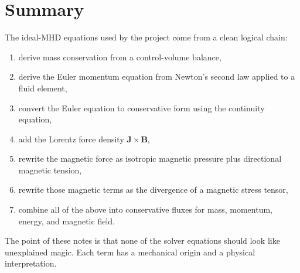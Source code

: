 \documentclass[11pt]{article}
\newcommand{\Bvec}{\mathbf{B}}
\newcommand{\Jvec}{\mathbf{J}}
\begin{document}
\section{Summary}
The ideal-MHD equations used by the project come from a clean logical chain:
\begin{enumerate}[leftmargin=1.8em]
    \item derive mass conservation from a control-volume balance,
    \item derive the Euler momentum equation from Newton's second law applied to a fluid element,
    \item convert the Euler equation to conservative form using the continuity equation,
    \item add the Lorentz force density $\Jvec\times\Bvec$,
    \item rewrite the magnetic force as isotropic magnetic pressure plus directional magnetic tension,
    \item rewrite those magnetic terms as the divergence of a magnetic stress tensor,
    \item combine all of the above into conservative fluxes for mass, momentum, energy, and magnetic field.
\end{enumerate}
The point of these notes is that none of the solver equations should look like unexplained magic. Each term has a mechanical origin and a physical interpretation.
\end{document}
